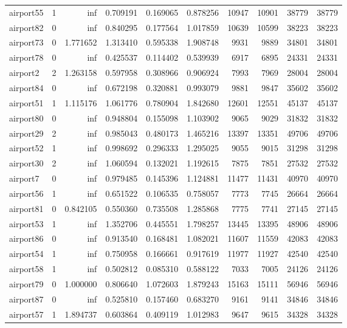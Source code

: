 \begin{longtable}{|l|r|r|r|r|r|r|r|r|r|}
airport55 & 1 & inf & 0.709191 & 0.169065 & 0.878256 & 10947 & 10901 & 38779 & 38779 \\
airport82 & 0 & inf & 0.840295 & 0.177564 & 1.017859 & 10639 & 10599 & 38223 & 38223 \\
airport73 & 0 & 1.771652 & 1.313410 & 0.595338 & 1.908748 & 9931 & 9889 & 34801 & 34801 \\
airport78 & 0 & inf & 0.425537 & 0.114402 & 0.539939 & 6917 & 6895 & 24331 & 24331 \\
airport2 & 2 & 1.263158 & 0.597958 & 0.308966 & 0.906924 & 7993 & 7969 & 28004 & 28004 \\
airport84 & 0 & inf & 0.672198 & 0.320881 & 0.993079 & 9881 & 9847 & 35602 & 35602 \\
airport51 & 1 & 1.115176 & 1.061776 & 0.780904 & 1.842680 & 12601 & 12551 & 45137 & 45137 \\
airport80 & 0 & inf & 0.948804 & 0.155098 & 1.103902 & 9065 & 9029 & 31832 & 31832 \\
airport29 & 2 & inf & 0.985043 & 0.480173 & 1.465216 & 13397 & 13351 & 49706 & 49706 \\
airport52 & 1 & inf & 0.998692 & 0.296333 & 1.295025 & 9055 & 9015 & 31298 & 31298 \\
airport30 & 2 & inf & 1.060594 & 0.132021 & 1.192615 & 7875 & 7851 & 27532 & 27532 \\
airport7 & 0 & inf & 0.979485 & 0.145396 & 1.124881 & 11477 & 11431 & 40970 & 40970 \\
airport56 & 1 & inf & 0.651522 & 0.106535 & 0.758057 & 7773 & 7745 & 26664 & 26664 \\
airport81 & 0 & 0.842105 & 0.550360 & 0.735508 & 1.285868 & 7775 & 7741 & 27145 & 27145 \\
airport53 & 1 & inf & 1.352706 & 0.445551 & 1.798257 & 13445 & 13395 & 48906 & 48906 \\
airport86 & 0 & inf & 0.913540 & 0.168481 & 1.082021 & 11607 & 11559 & 42083 & 42083 \\
airport54 & 1 & inf & 0.750958 & 0.166661 & 0.917619 & 11977 & 11927 & 42540 & 42540 \\
airport58 & 1 & inf & 0.502812 & 0.085310 & 0.588122 & 7033 & 7005 & 24126 & 24126 \\
airport79 & 0 & 1.000000 & 0.806640 & 1.072603 & 1.879243 & 15163 & 15111 & 56946 & 56946 \\
airport87 & 0 & inf & 0.525810 & 0.157460 & 0.683270 & 9161 & 9141 & 34846 & 34846 \\
airport57 & 1 & 1.894737 & 0.603864 & 0.409119 & 1.012983 & 9647 & 9615 & 34328 & 34328 \\

\end{longtable}
